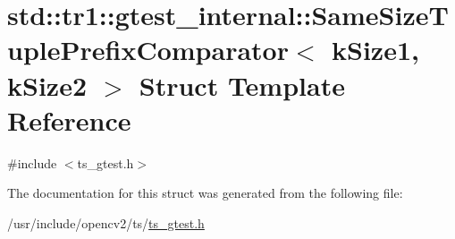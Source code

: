 \hypertarget{structstd_1_1tr1_1_1gtest__internal_1_1SameSizeTuplePrefixComparator}{\section{std\-:\-:tr1\-:\-:gtest\-\_\-internal\-:\-:Same\-Size\-Tuple\-Prefix\-Comparator$<$ k\-Size1, k\-Size2 $>$ Struct Template Reference}
\label{structstd_1_1tr1_1_1gtest__internal_1_1SameSizeTuplePrefixComparator}
}


{\ttfamily \#include $<$ts\-\_\-gtest.\-h$>$}



The documentation for this struct was generated from the following file\-:\begin{DoxyCompactItemize}
\item 
/usr/include/opencv2/ts/\hyperlink{ts__gtest_8h}{ts\-\_\-gtest.\-h}\end{DoxyCompactItemize}
